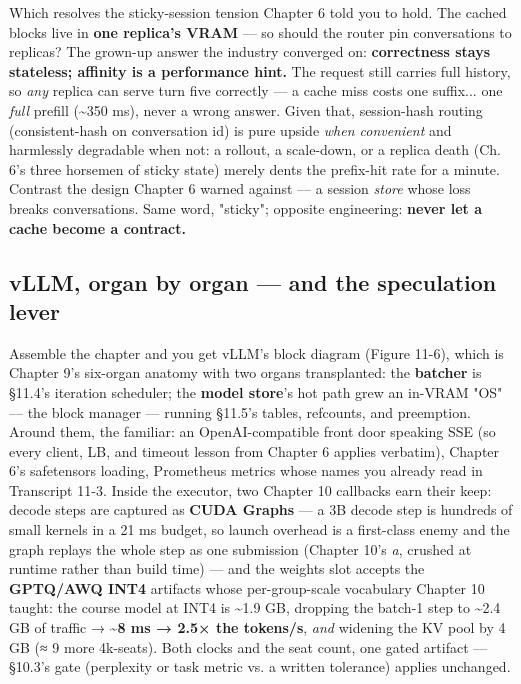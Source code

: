 Which resolves the sticky-session tension Chapter 6 told you to hold. The cached blocks live in \textbf{one replica's VRAM} — so should the router pin conversations to replicas? The grown-up answer the industry converged on: \textbf{correctness stays stateless; affinity is a performance hint.} The request still carries full history, so \textit{any} replica can serve turn five correctly — a cache miss costs one suffix... one \textit{full} prefill (\textasciitilde{}350 ms), never a wrong answer. Given that, session-hash routing (consistent-hash on conversation id) is pure upside \textit{when convenient} and harmlessly degradable when not: a rollout, a scale-down, or a replica death (Ch. 6's three horsemen of sticky state) merely dents the prefix-hit rate for a minute. Contrast the design Chapter 6 warned against — a session \textit{store} whose loss breaks conversations. Same word, "sticky"; opposite engineering: \textbf{never let a cache become a contract.}

\subsection*{vLLM, organ by organ — and the speculation lever}

Assemble the chapter and you get vLLM's block diagram (Figure 11-6), which is Chapter 9's six-organ anatomy with two organs transplanted: the \textbf{batcher} is §11.4's iteration scheduler; the \textbf{model store}'s hot path grew an in-VRAM "OS" — the block manager — running §11.5's tables, refcounts, and preemption. Around them, the familiar: an OpenAI-compatible front door speaking SSE (so every client, LB, and timeout lesson from Chapter 6 applies verbatim), Chapter 6's safetensors loading, Prometheus metrics whose names you already read in Transcript 11-3. Inside the executor, two Chapter 10 callbacks earn their keep: decode steps are captured as \textbf{CUDA Graphs} — a 3B decode step is hundreds of small kernels in a 21 ms budget, so launch overhead is a first-class enemy and the graph replays the whole step as one submission (Chapter 10's \textit{a}, crushed at runtime rather than build time) — and the weights slot accepts the \textbf{GPTQ/AWQ INT4} artifacts whose per-group-scale vocabulary Chapter 10 taught: the course model at INT4 is \textasciitilde{}1.9 GB, dropping the batch-1 step to \textasciitilde{}2.4 GB of traffic → \textbf{\textasciitilde{}8 ms → 2.5× the tokens/s}, \textit{and} widening the KV pool by 4 GB (≈ 9 more 4k-seats). Both clocks and the seat count, one gated artifact — §10.3's gate (perplexity or task metric vs. a written tolerance) applies unchanged.

